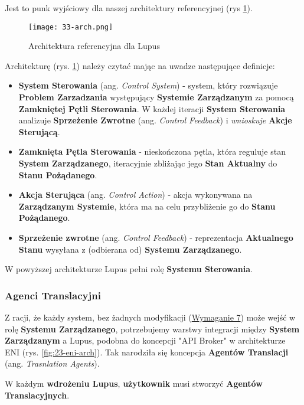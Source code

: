 Jest to punk wyjściowy dla naszej architektury referencyjnej (rys \ref{fig:33-arch}).

\begin{figure}[!h]
    \centering \texttt{[image: 33-arch.png]}
    \caption{Architektura referencyjna dla Lupus}\label{fig:33-arch}
\end{figure}

Architekturę (rys. \ref{fig:33-arch}) należy czytać mając na uwadze następujące definicje:

\begin{itemize}
    \item \textbf{System Sterowania} (ang. \textit{Control System}) - system, który rozwiązuje \textbf{Problem Zarzadzania} występujący \textbf{Systemie Zarządzanym} za pomocą \textbf{Zamkniętej Pętli Sterowania}. W każdej iteracji \textbf{System Sterowania} analizuje \textbf{Sprzeżenie Zwrotne} (ang. \textit{Control Feedback}) i \textit{wnioskuje} \textbf{Akcje Sterującą}.
    \item \textbf{Zamknięta Pętla Sterowania} - nieskończona pętla, która reguluje stan \textbf{System Zarządzanego}, iteracyjnie zbliżając jego \textbf{Stan Aktualny} do \textbf{Stanu Pożądanego}. 
    \item \textbf{Akcja Sterująca} (ang. \textit{Control Action}) - akcja wykonywana na \textbf{Zarządzanym Systemie}, która ma na celu przybliżenie go do \textbf{Stanu Pożądanego}.
    \item \textbf{Sprzeżenie zwrotne} (ang. \textit{Control Feedback}) - reprezentacja \textbf{Aktualnego Stanu} wysyłana z (odbierana od) \textbf{Systemu Zarządzanego}.
\end{itemize}

W powyższej architekturze Lupus pełni rolę \textbf{Systemu Sterowania}.

\subsubsection{Agenci Translacyjni}
Z racji, że każdy system, bez żadnych modyfikacji (\hyperref[req:7]{Wymaganie 7}) może wejść w rolę \textbf{Systemu Zarządzanego}, potrzebujemy warstwy integracji między \textbf{System Zarządzanym} a Lupus, podobna do koncepcji "API Broker" w architekturze ENI (rys. \ref{fig:23-eni-arch}). Tak narodziła się koncepcja \textbf{Agentów Translacji} (ang. \textit{Trasnlation Agents}). 

W każdym \textbf{wdrożeniu Lupus}, \textbf{użytkownik} musi stworzyć \textbf{Agentów Translacyjnych}. 

